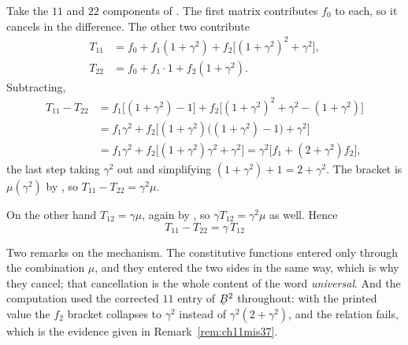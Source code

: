 \begin{solution}
Take the $11$ and $22$ components of . The first matrix
contributes $f_{0}$ to each, so it cancels in the difference. The other
two contribute
\[
\begin{aligned}
   T_{11}&=f_{0}+f_{1}(1+\gamma^{2})
   +f_{2}\big[(1+\gamma^{2})^{2}+\gamma^{2}\big],\\
   T_{22}&=f_{0}+f_{1}\cdot1+f_{2}(1+\gamma^{2}).
\end{aligned}
\]
Subtracting,
\[
\begin{aligned}
   T_{11}-T_{22}
   &=f_{1}\big[(1+\gamma^{2})-1\big]
    +f_{2}\big[(1+\gamma^{2})^{2}+\gamma^{2}-(1+\gamma^{2})\big]\\
   &=f_{1}\gamma^{2}
    +f_{2}\big[(1+\gamma^{2})\big((1+\gamma^{2})-1\big)+\gamma^{2}\big]\\
   &=f_{1}\gamma^{2}+f_{2}\big[(1+\gamma^{2})\gamma^{2}+\gamma^{2}\big]
    =\gamma^{2}\big[f_{1}+(2+\gamma^{2})f_{2}\big],
\end{aligned}
\]
the last step taking $\gamma^{2}$ out and simplifying
$(1+\gamma^{2})+1=2+\gamma^{2}$. The bracket is $\mu(\gamma^{2})$ by
, so $T_{11}-T_{22}=\gamma^{2}\mu$.

On the other hand $T_{12}=\gamma\mu$, again by , so
$\gamma T_{12}=\gamma^{2}\mu$ as well. Hence
\[
   \boxed{\;T_{11}-T_{22}=\gamma\,T_{12}\;}
\]

Two remarks on the mechanism. The constitutive functions entered only
through the combination $\mu$, and they entered the two sides in the
same way, which is why they cancel; that cancellation is the whole
content of the word \emph{universal}. And the computation used the
corrected $11$ entry of $\bB^{2}$ throughout: with the printed value the
$f_{2}$ bracket collapses to $\gamma^{2}$ instead of
$\gamma^{2}(2+\gamma^{2})$, and the relation fails, which is the
evidence given in Remark~\ref{rem:ch11mis37}.
\end{solution}

